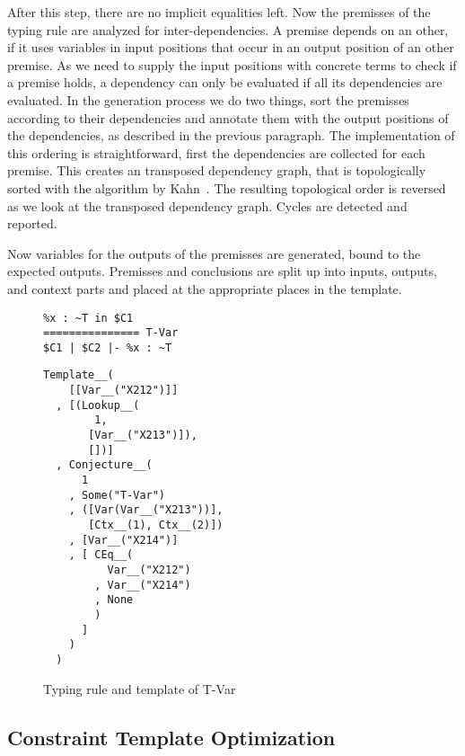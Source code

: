 After this step, there are no implicit equalities left. Now the
premisses of the typing rule are analyzed for inter-dependencies. A
premise depends on an other, if it uses variables in input positions
that occur in an output position of an other premise. As we need to
supply the input positions with concrete terms to check if a premise
holds, a dependency can only be evaluated if all its dependencies are
evaluated. In the generation process we do two things, sort the
premisses according to their dependencies and annotate them with the
output positions of the dependencies, as described in the previous
paragraph. The implementation of this ordering is straightforward,
first the dependencies are collected for each premise. This creates an
transposed dependency graph, that is topologically sorted with the
algorithm by Kahn~\cite{Kahn:1962:TSL:368996.369025}. The resulting
topological order is reversed as we look at the transposed dependency
graph. Cycles are detected and reported.

Now variables for the outputs of the premisses are generated, bound to
the expected outputs. Premisses and conclusions are split up into
inputs, outputs, and context parts and placed at the appropriate
places in the template.

\begin{figure}
  \centering
  \begin{minipage}{.45\linewidth}
\begin{verbatim}
%x : ~T in $C1
=============== T-Var
$C1 | $C2 |- %x : ~T
\end{verbatim}
  \end{minipage}
  \begin{minipage}{.45\linewidth}
\begin{verbatim}
Template__(
    [[Var__("X212")]]
  , [(Lookup__(
        1,
       [Var__("X213")]),
       [])]
  , Conjecture__(
      1
    , Some("T-Var")
    , ([Var(Var__("X213"))],
       [Ctx__(1), Ctx__(2)])
    , [Var__("X214")]
    , [ CEq__(
          Var__("X212")
        , Var__("X214")
        , None
        )
      ]
    )
  )
\end{verbatim}
  \end{minipage}
  \caption{Typing rule and template of T-Var}
  \label{fig:template-example}
\end{figure}
\subsection{Constraint Template Optimization}
\label{sec:constr-templ-optim}
